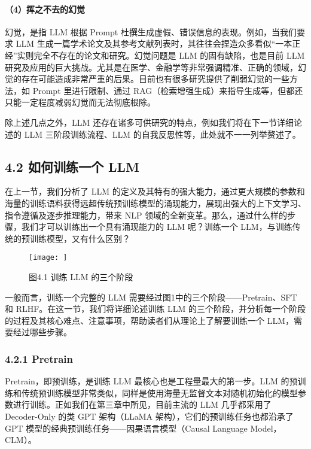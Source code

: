 \documentclass[12pt,a4paper]{book}
\begin{document}
\paragraph{（4）挥之不去的幻觉}\label{ux6325ux4e4bux4e0dux53bbux7684ux5e7bux89c9}

幻觉，是指 LLM 根据 Prompt
杜撰生成虚假、错误信息的表现。例如，当我们要求 LLM
生成一篇学术论文及其参考文献列表时，其往往会捏造众多看似``一本正经''实则完全不存在的论文和研究。幻觉问题是
LLM 的固有缺陷，也是目前 LLM
研究及应用的巨大挑战。尤其是在医学、金融学等非常强调精准、正确的领域，幻觉的存在可能造成非常严重的后果。目前也有很多研究提供了削弱幻觉的一些方法，如
Prompt 里进行限制、通过
RAG（检索增强生成）来指导生成等，但都还只能一定程度减弱幻觉而无法彻底根除。

除上述几点之外，LLM
还存在诸多可供研究的特点，例如我们将在下一节详细论述的 LLM
三阶段训练流程、LLM 的自我反思性等，此处就不一一列举赘述了。

\subsection{4.2 如何训练一个
LLM}\label{ux5982ux4f55ux8badux7ec3ux4e00ux4e2a-llm}

在上一节，我们分析了 LLM
的定义及其特有的强大能力，通过更大规模的参数和海量的训练语料获得远超传统预训练模型的涌现能力，展现出强大的上下文学习、指令遵循及逐步推理能力，带来
NLP
领域的全新变革。那么，通过什么样的步骤，我们才可以训练出一个具有涌现能力的
LLM 呢？训练一个 LLM，与训练传统的预训练模型，又有什么区别？

\begin{figure}[htbp]\centering
\texttt{[image: ]}
\caption{图4.1 训练 LLM 的三个阶段}
\end{figure}

一般而言，训练一个完整的 LLM 需要经过图1中的三个阶段------Pretrain、SFT
和 RLHF。在这一节，我们将详细论述训练 LLM
的三个阶段，并分析每一个阶段的过程及其核心难点、注意事项，帮助读者们从理论上了解要训练一个
LLM，需要经过哪些步骤。

\subsubsection{4.2.1 Pretrain}\label{pretrain}

Pretrain，即预训练，是训练 LLM 最核心也是工程量最大的第一步。LLM
的预训练和传统预训练模型非常类似，同样是使用海量无监督文本对随机初始化的模型参数进行训练。正如我们在第三章中所见，目前主流的
LLM 几乎都采用了 Decoder-Only 的类 GPT 架构（LLaMA
架构），它们的预训练任务也都沿承了 GPT
模型的经典预训练任务------因果语言模型（Causal Language Model，CLM）。
\end{document}
